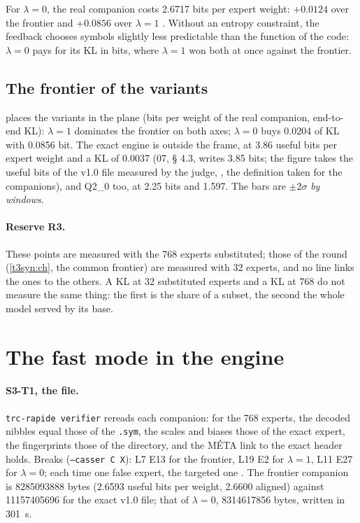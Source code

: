 For $\lambda = 0$, the real companion costs \num{2.6717} bits per expert weight: $+\num{0.0124}$ over the frontier and $+\num{0.0856}$ over $\lambda = 1$ \mes. Without an entropy constraint, the feedback chooses symbols slightly less predictable than the function of the code: $\lambda = 0$ pays for its KL in bits, where $\lambda = 1$ won both at once against the frontier.

\subsection{The frontier of the variants}\label{t3sno:sec:variantes}

 places the variants in the plane (bits per weight of the real companion, end-to-end KL): $\lambda = 1$ dominates the frontier on both axes; $\lambda = 0$ buys \num{0.0204} of KL with \num{0.0856} bit. The exact engine is outside the frame, at \num{3.86} useful bits per expert weight and a KL of \num{0.0037} (07, § 4.3, writes 3.85 bits; the figure takes the useful bits of the v1.0 file measured by the judge, , the definition taken for the companions), and Q2\_0 too, at \num{2.25} bits and \num{1.597}. The bars are $\pm 2\sigma$ \emph{by windows}.

\begin{figure}[tbp]
\centering
\GrapheSynoVariantes
{}
\label{fig:t3-syno-variantes}
\end{figure}

\paragraph{Reserve R3.} These points are measured with the 768 experts substituted; those of the round (\cref{t3syn:ch}, the common frontier) are measured with 32 experts, and no line links the ones to the others. A KL at 32 substituted experts and a KL at 768 do not measure the same thing: the first is the share of a subset, the second the whole model served by its base.

\section{The fast mode in the engine}\label{t3sno:sec:moteur}

\paragraph{S3-T1, the file.} \texttt{trc-rapide verifier} rereads each companion: for the 768 experts, the decoded nibbles equal those of the \texttt{.sym}, the scales and biases those of the exact expert, the fingerprints those of the directory, and the MÉTA link to the exact header holds. Breaks (\texttt{--casser C X}): L7 E13 for the frontier, L19 E2 for $\lambda = 1$, L11 E27 for $\lambda = 0$; each time one false expert, the targeted one \mes. The frontier companion is \num{8285093888} bytes (\num{2.6593} useful bits per weight, \num{2.6600} aligned) against \num{11157405696} for the exact v1.0 file; that of $\lambda = 0$, \num{8314617856} bytes, written in \SI{301}{\second}.

